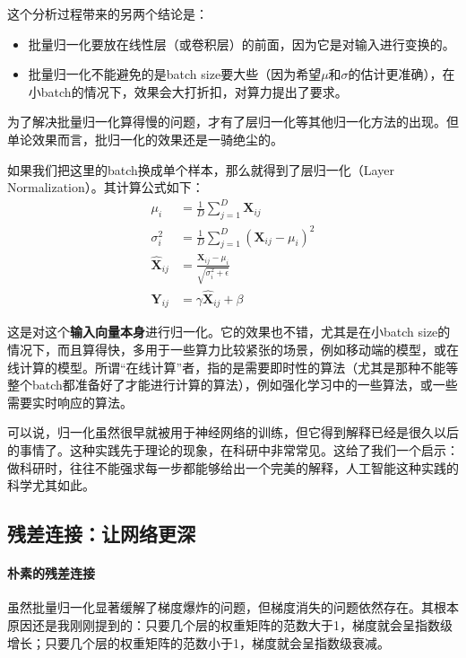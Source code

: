 这个分析过程带来的另两个结论是：
\begin{corollary}{}{}
\begin{itemize}
    \item 批量归一化要放在线性层（或卷积层）的前面，因为它是对输入进行变换的。
    \item 批量归一化不能避免的是batch size要大些（因为希望$\mu$和$\sigma$的估计更准确），在小batch的情况下，效果会大打折扣，对算力提出了要求。
\end{itemize}
\end{corollary}

为了解决批量归一化算得慢的问题，才有了层归一化等其他归一化方法的出现。但单论效果而言，批归一化的效果还是一骑绝尘的。

如果我们把这里的batch换成单个样本，那么就得到了层归一化（Layer Normalization）\cite{ba2016layernormalization}。其计算公式如下：
\begin{align}
    \mu_i &= \frac{1}{D} \sum_{j=1}^{D} \mathbf{X}_{ij} \\
    \sigma_i^2 &= \frac{1}{D} \sum_{j=1}^{D} (\mathbf{X}_{ij} - \mu_i)^2 \\
    \hat{\mathbf{X}}_{ij} &= \frac{\mathbf{X}_{ij} - \mu_i}{\sqrt{\sigma_i^2 + \epsilon}} \\
    \mathbf{Y}_{ij} &= \gamma \hat{\mathbf{X}}_{ij} + \beta
\end{align}

这是对这个\textbf{输入向量本身}进行归一化。它的效果也不错，尤其是在小batch size的情况下，而且算得快，多用于一些算力比较紧张的场景，例如移动端的模型，或在线计算的模型。所谓“在线计算”者，指的是需要即时性的算法（尤其是那种不能等整个batch都准备好了才能进行计算的算法），例如强化学习中的一些算法，或一些需要实时响应的算法。

可以说，归一化虽然很早就被用于神经网络的训练，但它得到解释已经是很久以后的事情了。这种实践先于理论的现象，在科研中非常常见。这给了我们一个启示：做科研时，往往不能强求每一步都能够给出一个完美的解释，人工智能这种实践的科学尤其如此。

\subsection{残差连接：让网络更深}

\paragraph{朴素的残差连接}

虽然批量归一化显著缓解了梯度爆炸的问题，但梯度消失的问题依然存在。其根本原因还是我刚刚提到的：只要几个层的权重矩阵的范数大于1，梯度就会呈指数级增长；只要几个层的权重矩阵的范数小于1，梯度就会呈指数级衰减。


